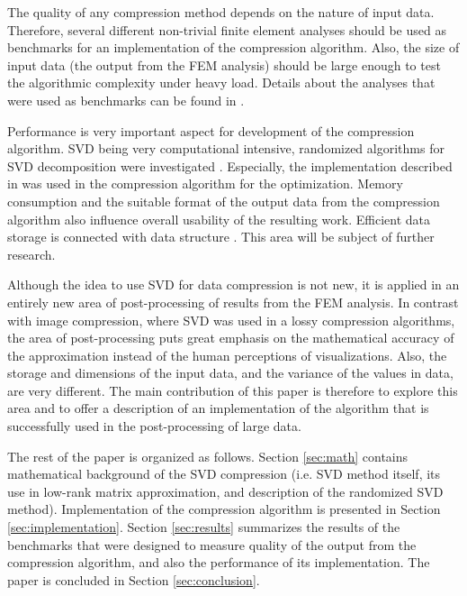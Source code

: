 The quality of any compression method depends on the nature of input data. Therefore, several different non-trivial finite element analyses should be used as benchmarks for an implementation of the compression algorithm. Also, the size of input data (the output from the FEM analysis) should be large enough to test the algorithmic complexity under heavy load. Details about the analyses that were used as benchmarks can be found in \cite{Kruis2012, Koudelka2009, Koudelka2006, Kruis2005}.

Performance is very important aspect for development of the compression algorithm. SVD being very computational intensive, randomized algorithms for SVD decomposition were investigated \cite{Candes2011, Woolfe2008, Martinsson2011, Szlam2014}. Especially, the implementation described in \cite{Halko2011} was used in the compression algorithm for the optimization. Memory consumption and the suitable format of the output data from the compression algorithm also influence overall usability of the resulting work. Efficient data storage is connected with data structure \cite{Ivanyi2012, Ivanyi2014}. This area will be subject of further research.

Although the idea to use SVD for data compression is not new, it is applied in an entirely new area of post-processing of results from the FEM analysis. In contrast with image compression, where SVD was used in a lossy compression algorithms, the area of post-processing puts great emphasis on the mathematical accuracy of the approximation instead of the human perceptions of visualizations. Also, the storage and dimensions of the input data, and the variance of the values in data, are very different. The main contribution of this paper is therefore to explore this area and to offer a description of an implementation of the algorithm that is successfully used in the post-processing of large data.

The rest of the paper is organized as follows. Section \ref{sec:math} contains mathematical background of the SVD compression (i.e. SVD method itself, its use in low-rank matrix approximation, and description of the randomized SVD method). Implementation of the compression algorithm is presented in Section \ref{sec:implementation}. Section \ref{sec:results} summarizes the results of the benchmarks that were designed to measure quality of the output from the compression algorithm, and also the performance of its implementation. The paper is concluded in Section \ref{sec:conclusion}.
